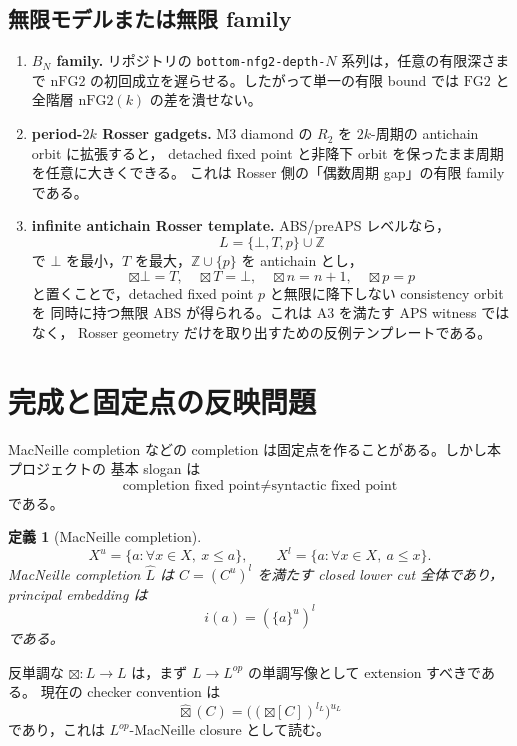 ﻿\documentclass[a4paper,10pt]{ltjsarticle}
\newtheorem{definition}[theorem]{定義}
\newcommand{\ABS}{\mathrm{ABS}}
\newcommand{\APS}{\mathrm{APS}}
\newcommand{\FGtwo}{\mathrm{FG2}}
\newcommand{\nFGtwo}{\mathrm{nFG2}}
\newcommand{\Btx}{\boxtimes}
\newcommand{\Top}{T}
\newcommand{\Bot}{\bot}
\begin{document}
\subsection{無限モデルまたは無限 family}

\begin{enumerate}
\item \textbf{\(B_N\) family.}
リポジトリの \texttt{bottom-nfg2-depth-\(N\)} 系列は，任意の有限深さまで
\(\nFGtwo\) の初回成立を遅らせる。したがって単一の有限 bound では
\(\FGtwo\) と全階層 \(\nFGtwo(k)\) の差を潰せない。

\item \textbf{period-\(2k\) Rosser gadgets.}
M3 diamond の \(R_2\) を \(2k\)-周期の antichain orbit に拡張すると，
detached fixed point と非降下 orbit を保ったまま周期を任意に大きくできる。
これは Rosser 側の「偶数周期 gap」の有限 family である。

\item \textbf{infinite antichain Rosser template.}
ABS/preAPS レベルなら，
\[
L=\{\Bot,\Top,p\}\cup\mathbb Z
\]
で \(\Bot\) を最小，\(\Top\) を最大，\(\mathbb Z\cup\{p\}\) を antichain とし，
\[
\Btx\Bot=\Top,\quad \Btx\Top=\Bot,\quad
\Btx n=n+1,\quad \Btx p=p
\]
と置くことで，detached fixed point \(p\) と無限に降下しない consistency orbit を
同時に持つ無限 \(\ABS\) が得られる。これは A3 を満たす \(\APS\) witness ではなく，
Rosser geometry だけを取り出すための反例テンプレートである。
\end{enumerate}

\section{完成と固定点の反映問題}

MacNeille completion などの completion は固定点を作ることがある。しかし本プロジェクトの
基本 slogan は
\[
\text{completion fixed point}
\neq
\text{syntactic fixed point}
\]
である。

\begin{definition}[MacNeille completion]
\[
X^u=\{a:\forall x\in X,\ x\le a\},\qquad
X^l=\{a:\forall x\in X,\ a\le x\}.
\]
MacNeille completion \(\widehat L\) は \(C=(C^u)^l\) を満たす closed lower cut 全体であり，
principal embedding は
\[
i(a)=(\{a\}^u)^l
\]
である。
\end{definition}

反単調な \(\Btx:L\to L\) は，まず \(L\to L^{op}\) の単調写像として extension すべきである。
現在の checker convention は
\[
\widehat{\Btx}(C)=\bigl((\Btx[C])^{l_L}\bigr)^{u_L}
\]
であり，これは \(L^{op}\)-MacNeille closure として読む。
\end{document}
